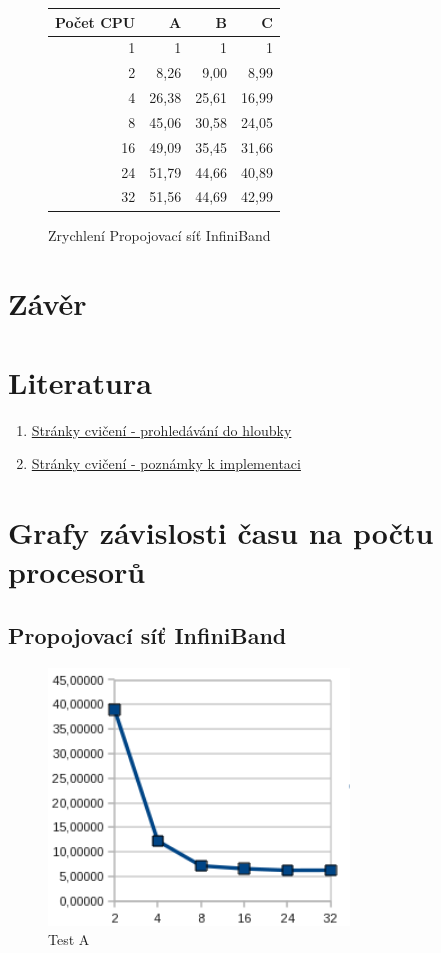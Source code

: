\documentclass[12pt]{article}
\begin{document}
\begin{figure}[h]
 \caption{Zrychlení Propojovací síť InfiniBand}
\begin{center}
\begin{tabular}{|r|r|r|r|}
\hline
Počet CPU & A & B & C\\
\hline
1 & 1 & 1 & 1\\
\hline
2 & 8,26 & 9,00 & 8,99\\
\hline
4 & 26,38 & 25,61 & 16,99\\
\hline
8 & 45,06 & 30,58 & 24,05\\
\hline
16 & 49,09 & 35,45 & 31,66\\
\hline
24 & 51,79 & 44,66 & 40,89\\
\hline
32 & 51,56 & 44,69 & 42,99\\
\hline
\end{tabular} 
\end{center}
\end{figure}

\section{Závěr}


\section{Literatura}
\begin{enumerate}
\item \href{https://edux.fit.cvut.cz/courses/MI-PAR/labs/prohledavani_do_hloubky}{Stránky cvičení - prohledávání do hloubky}
\item \href{https://edux.fit.cvut.cz/courses/MI-PAR/labs/poznamky_k_implementaci}{Stránky cvičení - poznámky k implementaci}
\end{enumerate}


\appendix
\section{Grafy závislosti času na počtu procesorů}
\subsection{Propojovací síť InfiniBand}
\begin{figure}[h]
\begin{center}
\includegraphics[width=8cm]{grafy-zprava/testAinfib.png}
\caption{Test A}
\label{fig:testAinfib}
\end{center}
\end{figure}
\end{document}
